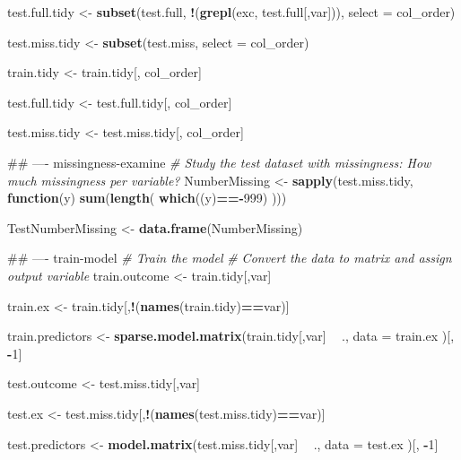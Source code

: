 \documentclass[]{book}
\newenvironment{Shaded}{\begin{snugshade}}{\end{snugshade}}
\newcommand{\KeywordTok}[1]{\textcolor[rgb]{0.13,0.29,0.53}{\textbf{#1}}}
\newcommand{\DataTypeTok}[1]{\textcolor[rgb]{0.13,0.29,0.53}{#1}}
\newcommand{\DecValTok}[1]{\textcolor[rgb]{0.00,0.00,0.81}{#1}}
\newcommand{\StringTok}[1]{\textcolor[rgb]{0.31,0.60,0.02}{#1}}
\newcommand{\CommentTok}[1]{\textcolor[rgb]{0.56,0.35,0.01}{\textit{#1}}}
\newcommand{\ControlFlowTok}[1]{\textcolor[rgb]{0.13,0.29,0.53}{\textbf{#1}}}
\newcommand{\OperatorTok}[1]{\textcolor[rgb]{0.81,0.36,0.00}{\textbf{#1}}}
\newcommand{\NormalTok}[1]{#1}
\begin{document}
\begin{Shaded}
\begin{Highlighting}[]
\NormalTok{  test.full.tidy <-}\StringTok{ }\KeywordTok{subset}\NormalTok{(test.full, }\OperatorTok{!}\NormalTok{(}\KeywordTok{grepl}\NormalTok{(exc, test.full[,var])), }\DataTypeTok{select =}\NormalTok{ col_order)}
  
\NormalTok{  test.miss.tidy <-}\StringTok{ }\KeywordTok{subset}\NormalTok{(test.miss, }\DataTypeTok{select =}\NormalTok{ col_order)}
  
\NormalTok{  train.tidy <-}\StringTok{ }\NormalTok{train.tidy[, col_order]}
  
\NormalTok{  test.full.tidy <-}\StringTok{ }\NormalTok{test.full.tidy[, col_order]}
  
\NormalTok{  test.miss.tidy <-}\StringTok{ }\NormalTok{test.miss.tidy[, col_order]}
  
\NormalTok{  ## ---- missingness-examine}
  \CommentTok{# Study the test dataset with missingness: How much missingness per variable?}
\NormalTok{  NumberMissing <-}\StringTok{ }\KeywordTok{sapply}\NormalTok{(test.miss.tidy, }\ControlFlowTok{function}\NormalTok{(y) }\KeywordTok{sum}\NormalTok{(}\KeywordTok{length}\NormalTok{(}
    \KeywordTok{which}\NormalTok{((y)}\OperatorTok{==-}\DecValTok{999}\NormalTok{)}
\NormalTok{  )))}
  
\NormalTok{  TestNumberMissing <-}\StringTok{ }\KeywordTok{data.frame}\NormalTok{(NumberMissing)}
  
\NormalTok{  ## ---- train-model}
  \CommentTok{# Train the model}
  \CommentTok{# Convert the data to matrix and assign output variable}
\NormalTok{  train.outcome <-}\StringTok{ }\NormalTok{train.tidy[,var]}
  
\NormalTok{  train.ex <-}\StringTok{ }\NormalTok{train.tidy[,}\OperatorTok{!}\NormalTok{(}\KeywordTok{names}\NormalTok{(train.tidy)}\OperatorTok{==}\NormalTok{var)]}
  
\NormalTok{  train.predictors <-}\StringTok{ }\KeywordTok{sparse.model.matrix}\NormalTok{(train.tidy[,var] }\OperatorTok{~}\StringTok{ }\NormalTok{.,}
                                          \DataTypeTok{data =}\NormalTok{ train.ex}
\NormalTok{  )[, }\OperatorTok{-}\DecValTok{1}\NormalTok{]}
  
\NormalTok{  test.outcome <-}\StringTok{ }\NormalTok{test.miss.tidy[,var]}
  
\NormalTok{  test.ex <-}\StringTok{ }\NormalTok{test.miss.tidy[,}\OperatorTok{!}\NormalTok{(}\KeywordTok{names}\NormalTok{(test.miss.tidy)}\OperatorTok{==}\NormalTok{var)]}
  
\NormalTok{  test.predictors <-}\StringTok{ }\KeywordTok{model.matrix}\NormalTok{(test.miss.tidy[,var] }\OperatorTok{~}\StringTok{ }\NormalTok{.,}
                                  \DataTypeTok{data =}\NormalTok{ test.ex}
\NormalTok{  )[, }\OperatorTok{-}\DecValTok{1}\NormalTok{]}
  

\end{Highlighting}
\end{Shaded}
\end{document}
